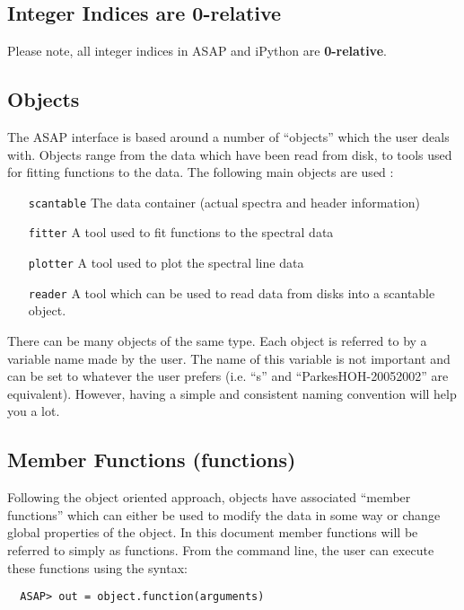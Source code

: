 \documentclass[11pt]{article}
\newcommand{\cmd}[1]{{\tt #1}}
\begin{document}
\subsection {Integer Indices are 0-relative}

Please note, all integer indices in ASAP and iPython are {\bf 0-relative}.

\subsection{Objects}
The ASAP interface is based around a number of ``objects'' which the
user deals with. Objects range from the data which have been read from
disk, to tools used for fitting functions to the data. The following
main objects are used :

\begin{itemize}
  \item[\cmd{scantable}] The data container (actual spectra and header
    information)
  \item[\cmd{fitter}] A tool used to fit functions to the spectral data
  \item[\cmd{plotter}] A tool used to plot the spectral line data
  \item[\cmd{reader}] A tool which can be used to read data from disks
    into a scantable object.
\end{itemize}

There can be many objects of the same type. Each object is referred to
by a variable name made by the user. The name of this variable is not
important and can be set to whatever the user prefers (i.e. ``s'' and
``ParkesHOH-20052002'' are equivalent).  However, having a simple and
consistent naming convention will help you a lot.

\subsection{Member Functions (functions)}

Following the object oriented approach,
objects have associated ``member functions'' which can either be used
to modify the data in some way or change global properties of the
object. In this document member functions will be referred to simply
as functions. From the command line, the user can execute these
functions using the syntax:
\begin{verbatim}
  ASAP> out = object.function(arguments)
\end{verbatim}
\end{document}
